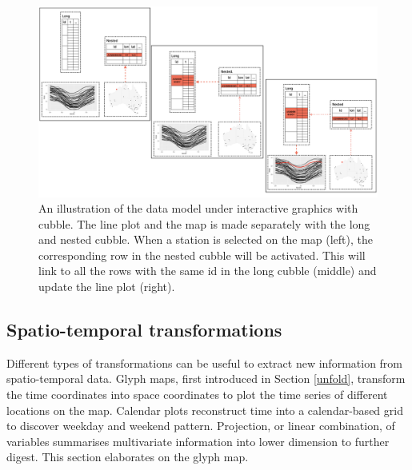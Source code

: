 \documentclass[
]{jss}
\begin{document}
\begin{CodeChunk}
\begin{figure}

{\centering \includegraphics[width=1\linewidth,height=0.4\textheight]{../figures/diagram-keynotes/diagram-keynotes.004} 

}

\caption[An illustration of the data model under interactive graphics with cubble]{An illustration of the data model under interactive graphics with cubble. The line plot and the map is made separately with the long and nested cubble. When a station is selected on the map (left), the corresponding row in the nested cubble will be activated. This will link to all the rows with the same id in the long cubble (middle) and update the line plot (right).}\label{fig:illu-interactive}
\end{figure}
\end{CodeChunk}

\hypertarget{st_transformation}{%
\subsection{Spatio-temporal transformations}\label{st_transformation}}

Different types of transformations can be useful to extract new information from spatio-temporal data. Glyph maps, first introduced in Section \ref{unfold}, transform the time coordinates into space coordinates to plot the time series of different locations on the map. Calendar plots \citep{wang2020calendar} reconstruct time into a calendar-based grid to discover weekday and weekend pattern. Projection, or linear combination, of variables summarises multivariate information into lower dimension to further digest. This section elaborates on the glyph map.
\end{document}
